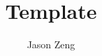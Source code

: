 \documentclass[12pt]{article}
\begin{document}
\title{Template}
\author{Jason Zeng}

\maketitle
\end{document}
